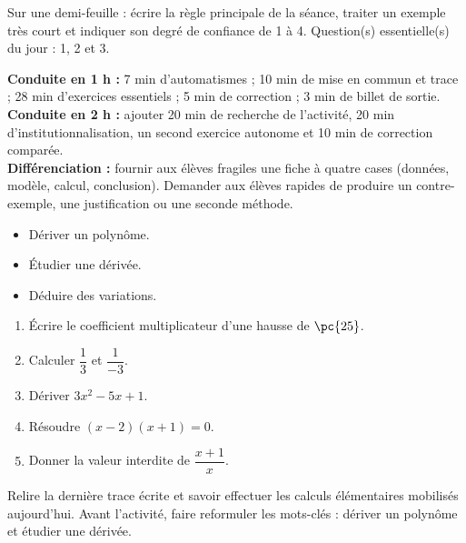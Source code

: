 \begin{exitticket}[3 minutes]Sur une demi-feuille : écrire la règle principale de la séance, traiter un exemple très court et indiquer son degré de confiance de 1 à 4. Question(s) essentielle(s) du jour : 1, 2 et 3.\end{exitticket}

\ifmxteacher
\begin{method}
\textbf{Conduite en 1 h :} 7 min d'automatismes ; 10 min de mise en commun et trace ; 28 min d'exercices essentiels ; 5 min de correction ; 3 min de billet de sortie.\\
\textbf{Conduite en 2 h :} ajouter 20 min de recherche de l'activité, 20 min d'institutionnalisation, un second exercice autonome et 10 min de correction comparée.\\
\textbf{Différenciation :} fournir aux élèves fragiles une fiche à quatre cases (données, modèle, calcul, conclusion). Demander aux élèves rapides de produire un contre-exemple, une justification ou une seconde méthode.
\end{method}
\fi
{}
\begin{objectives}\begin{itemize}\item Dériver un polynôme.\item Étudier une dérivée.\item Déduire des variations.\end{itemize}\end{objectives}
\begin{fluency}\begin{enumerate}\item Écrire le coefficient multiplicateur d'une hausse de $\pc{25}$. \item Calculer $\dfrac1{3}$ et $\dfrac1{-3}$. \item Dériver $3x^2-5x+1$. \item Résoudre $(x-2)(x+1)=0$. \item Donner la valeur interdite de $\dfrac{x+1}{x}$. \end{enumerate}\end{fluency}
\begin{prerequisites}Relire la dernière trace écrite et savoir effectuer les calculs élémentaires mobilisés aujourd'hui. Avant l'activité, faire reformuler les mots-clés : dériver un polynôme et étudier une dérivée.\end{prerequisites}

